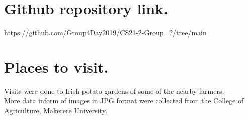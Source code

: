 \documentclass[11pt]{report}
\begin{document}
\newpage
\section{Github repository link.}
https://github.com/Group4Day2019/CS21-2-Group\_2/tree/main\\

\section{Places to visit.}
Visits were done to Irish potato gardens of some of the nearby farmers.\\
More data inform of images in JPG format were collected from the College of Agriculture, Makerere University.\\ 

\vspace{5mm}


 
\end{document}
